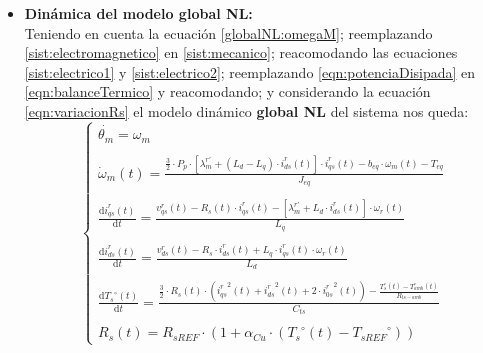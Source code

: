 \documentclass[10pt]{article}
\begin{document}
\begin{enumerate}
\begin{itemize}
		\item \textbf{Dinámica del modelo global NL:}\vspace{0.3cm}\\
		Teniendo en cuenta la ecuación \ref{globalNL:omegaM}; reemplazando \ref{sist:electromagnetico} en \ref{sist:mecanico}; reacomodando las ecuaciones \ref{sist:electrico1} y \ref{sist:electrico2}; reemplazando \ref{eqn:potenciaDisipada} en \ref{eqn:balanceTermico} y reacomodando; y considerando la ecuación \ref{eqn:variacionRs} el modelo dinámico \textbf{global NL} del sistema nos queda:
		\begin{equation}
			\label{eqn:sistGlobalNL}
			\begin{cases}
				\dot{\theta_{m}}=\omega_{m}
				\\
				\\
				\dot{\omega }_{m}\left ( t \right )=\frac{\frac{3}{2} \cdot P_{p} \cdot \left [ \lambda_{m}^{r'}+\left ( L_{d}-L_{q} \right )\cdot i_{ds}^{r} \left ( t \right ) \right ] \cdot i_{qs}^{r}\left ( t \right )-b_{eq}\cdot \omega_{m}\left ( t \right )-T_{eq}}{J_{eq}}
				\\
				\\
				\frac{\mathrm{d} i_{qs}^{r}\left ( t \right )}{\mathrm{d} t}=\frac{v_{qs}^{r}\left ( t \right )-R_{s}\left ( t \right )\cdot i_{qs}^{r}\left ( t \right )-\left [ \lambda_{m}^{r'}+L_{d}\cdot i_{ds}^{r}\left ( t \right ) \right ]\cdot \omega_{r}\left ( t \right )}{L_{q}}
				\\
				\\
				\frac{\mathrm{d} i_{ds}^{r}\left ( t \right )}{\mathrm{d} t}=\frac{v_{ds}^{r}\left ( t \right )-R_{s}\cdot i_{ds}^{r}\left ( t \right )+L_{q}\cdot i_{qs}^{r}\left ( t \right )\cdot \omega_{r}\left ( t \right )}{L_{d}}
				\\
				\\
				\frac{\mathrm{d} {T_{s}}^{\circ}\left ( t \right )}{\mathrm{d} t}=\frac{\frac{3}{2}\cdot R_{s}\left ( t \right )\cdot \left ( {i_{qs}^{r}}^{2}\left ( t \right )+{i_{ds}^{r}}^{2}\left ( t \right )+2\cdot {i_{0s}^{r}}^{2}\left ( t \right ) \right )
-\frac{T_{s}^{\circ}\left ( t \right )-T_{amb}^{\circ}\left ( t \right )}{R_{ts-amb}}}{C_{ts}}
				\\
				\\
				R_{s}\left ( t \right )=R_{sREF}\cdot \left ( 1+\alpha_{Cu}\cdot \left ( {T_{s}}^{\circ}\left ( t \right )-{T_{sREF}}^{\circ} \right ) \right )
				

\end{cases}
\end{equation}
\end{itemize}
\end{enumerate}
\end{document}
